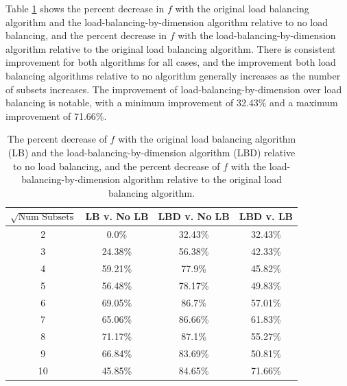 Table \ref{metric_improvement} shows the percent decrease in $f$ with the original load balancing algorithm and the load-balancing-by-dimension algorithm relative to no load balancing, and the percent decrease in $f$ with the load-balancing-by-dimension algorithm relative to the original load balancing algorithm.
There is consistent improvement for both algorithms for all cases, and the improvement both load balancing algorithms relative to no algorithm generally increases as the number of subsets increases. The improvement of load-balancing-by-dimension over load balancing is notable, with a minimum improvement of 32.43\% and a maximum improvement of 71.66\%.
\begin{table}[H]
\centering
\caption{The percent decrease of $f$ with the original load balancing algorithm (LB) and the load-balancing-by-dimension algorithm (LBD) relative to no load balancing, and the percent decrease of $f$ with the load-balancing-by-dimension algorithm relative to the original load balancing algorithm.}
\label{metric_improvement}
\begin{tabular}{c|c|c|c}
\centering
\textbf{$\sqrt{\text{Num Subsets}}$} & \textbf{LB v. No LB}  & \textbf{LBD v. No LB} & \textbf{LBD v. LB} \\ \hline
2&0.0\%&32.43\%&32.43\%\\ \hline
3&24.38\%&56.38\%&42.33\%\\ \hline
4&59.21\%&77.9\%&45.82\%\\ \hline
5&56.48\%&78.17\%&49.83\%\\ \hline
6&69.05\%&86.7\%&57.01\%\\ \hline
7&65.06\%&86.66\%&61.83\%\\ \hline
8&71.17\%&87.1\%&55.27\%\\ \hline
9&66.84\%&83.69\%&50.81\%\\ \hline
10&45.85\%&84.65\%&71.66\%
\end{tabular}
\end{table}

